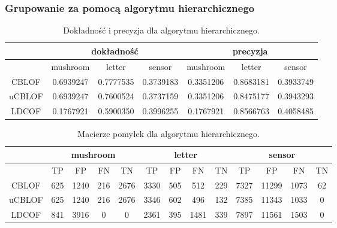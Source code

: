 \documentclass[11pt,a4paper,twoside]{article}
\begin{document}

\subsubsection{Grupowanie za pomocą algorytmu hierarchicznego }

\begin{table}[H]
\centering
\caption{Dokładność i precyzja dla algorytmu hierarchicznego.}
\label{accPrec_hierarchic}
\begin{tabular}{|*{7}{c|}}
\hline
 & \multicolumn{3}{c|}{dokładność} & \multicolumn{3}{c|}{precyzja} \\\hline
 & mushroom & letter & sensor & mushroom & letter & sensor \\\hline
 CBLOF &     0.6939247    &     0.7777535   &    0.3739183   &   0.3351206  &   0.8683181  &    0.3933749   \\\hline
 uCBLOF &  0.6939247   &     0.7600524   &   0.3737159    &   0.3351206  &  0.8475177  & 0.3943293 \\\hline
 LDCOF &    0.1767921      &     0.5900350    &   0.3996255 &  0.1767921   &   0.8566763   &    0.4058485   \\\hline
\end{tabular}
\end{table}


\begin{table}[H]
\centering
\caption{Macierze pomyłek dla algorytmu hierarchicznego.}
\label{confMatrix_hierarchic}
\begin{tabular}{|*{13}{c|}}
\hline
 & \multicolumn{4}{c|}{mushroom} & \multicolumn{4}{c|}{letter} & \multicolumn{4}{c|}{sensor} \\\hline
 & TP & FP & FN & TN  & TP & FP & FN & TN  & TP & FP & FN & TN \\\hline
 CBLOF &     625    &   1240      &   216    &    2676    &    3330   &   505   &   512      &   229   & 7327 & 11299 & 1073 &     62 \\\hline
 uCBLOF &   625    &   1240      &    216    &    2676   &    3346   &   602   &   496      &   132   & 7385 & 11343 & 1033  & 0   \\\hline
 LDCOF &     841    &    3916     &    0       &     0         &    2361   &   395   &   1481    &   339    & 7897 & 11561 & 1503 & 0 \\\hline
\end{tabular}
\end{table}
\end{document}
